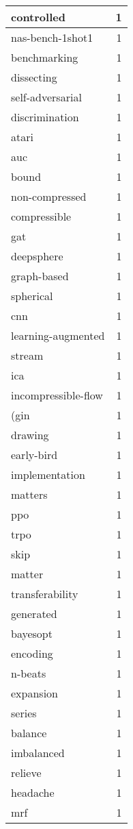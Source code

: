 \begin{table}[h]
\begin{tabular}{|l|r|}
\hline
controlled & 1 \\
\hline
nas-bench-1shot1 & 1 \\
\hline
benchmarking & 1 \\
\hline
dissecting & 1 \\
\hline
self-adversarial & 1 \\
\hline
discrimination & 1 \\
\hline
atari & 1 \\
\hline
auc & 1 \\
\hline
bound & 1 \\
\hline
non-compressed & 1 \\
\hline
compressible & 1 \\
\hline
gat & 1 \\
\hline
deepsphere & 1 \\
\hline
graph-based & 1 \\
\hline
spherical & 1 \\
\hline
cnn & 1 \\
\hline
learning-augmented & 1 \\
\hline
stream & 1 \\
\hline
ica & 1 \\
\hline
incompressible-flow & 1 \\
\hline
(gin & 1 \\
\hline
drawing & 1 \\
\hline
early-bird & 1 \\
\hline
implementation & 1 \\
\hline
matters & 1 \\
\hline
ppo & 1 \\
\hline
trpo & 1 \\
\hline
skip & 1 \\
\hline
matter & 1 \\
\hline
transferability & 1 \\
\hline
generated & 1 \\
\hline
bayesopt & 1 \\
\hline
encoding & 1 \\
\hline
n-beats & 1 \\
\hline
expansion & 1 \\
\hline
series & 1 \\
\hline
balance & 1 \\
\hline
imbalanced & 1 \\
\hline
relieve & 1 \\
\hline
headache & 1 \\
\hline
mrf & 1 \\

\end{tabular}
\end{table}
